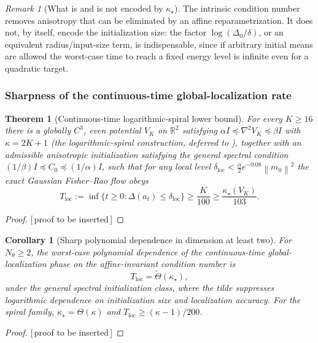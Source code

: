 \documentclass[11pt]{article}
\theoremstyle{plain}
\newtheorem{theorem}{Theorem}[section]
\newtheorem{corollary}[corollary]{Corollary}
\theoremstyle{definition}
\theoremstyle{remark}
\newtheorem{remark}[remark]{Remark}
\newcommand{\R}{\mathbb{R}}
\newcommand{\Id}{I}
\newcommand{\norm}[1]{\left\lVert #1\right\rVert}
\newcommand{\PROOFHOLE}{{\color{red}\textsf{[\,proof to be inserted\,]}}}
\newcommand{\kappastar}{\kappa_\star}
\begin{document}
\begin{remark}[What is and is not encoded by $\kappastar$]
The intrinsic condition number removes anisotropy that can be eliminated by an affine
reparametrization. It does not, by itself, encode the initialization size: the factor
$\log(\Delta_0/\delta)$, or an equivalent radius/input-size term, is indispensable, since if arbitrary
initial means are allowed the worst-case time to reach a fixed energy level is infinite even for a
quadratic target.
\end{remark}

\subsubsection{Sharpness of the continuous-time global-localization rate}

\begin{theorem}[Continuous-time logarithmic-spiral lower bound]
\label{thm:spiral-sharp}
For every $K\geq16$ there is a globally $C^3$, even potential $V_K$ on $\R^2$ satisfying
$\alpha\Id\preceq\nabla^2V_K\preceq\beta\Id$ with $\kappa=2K+1$ (the logarithmic-spiral construction,
deferred to ), together with an admissible anisotropic initialization satisfying the
general spectral condition $(1/\beta)\Id\preceq C_0\preceq(1/\alpha)\Id$, such that for any local level
$\delta_{\mathrm{loc}}<\tfrac\alpha2 e^{-0.08}\norm{m_0}^2$ the exact Gaussian Fisher--Rao flow obeys
\begin{equation}
\label{eq:spiral-lower-time}
    \boxed{T_{\mathrm{loc}}:=\inf\{t\geq0:\Delta(a_t)\leq\delta_{\mathrm{loc}}\}
    \geq\frac K{100}\geq\frac{\kappastar(V_K)}{103}.}
\end{equation}
\end{theorem}
\begin{proof}
\PROOFHOLE
\end{proof}

\begin{corollary}[Sharp polynomial dependence in dimension at least two]
\label{cor:cont-sharp}
For $N_\theta\geq2$, the worst-case polynomial dependence of the continuous-time global-localization
phase on the affine-invariant condition number is
\begin{equation}
\label{eq:cont-sharp-rate}
    \boxed{T_{\mathrm{loc}}=\widetilde\Theta(\kappastar),}
\end{equation}
under the general spectral initialization class, where the tilde suppresses logarithmic dependence on
initialization size and localization accuracy. For the spiral family, $\kappastar=\Theta(\kappa)$ and
$T_{\mathrm{loc}}\geq(\kappa-1)/200$.
\end{corollary}
\begin{proof}
\PROOFHOLE
\end{proof}
\end{document}
